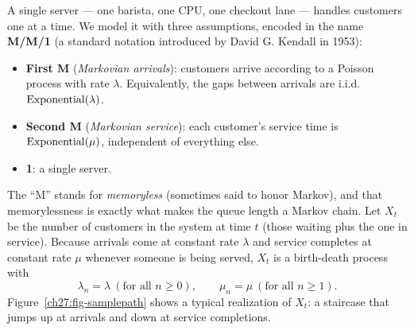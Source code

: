 A single server --- one barista, one CPU, one checkout lane --- handles
customers one at a time. We model it with three assumptions, encoded in the name
\textbf{M/M/1} (a standard notation introduced by David G. Kendall in 1953):

\begin{itemize}
  \item \textbf{First M} (\emph{Markovian arrivals}): customers arrive according to a Poisson process
  with rate $\lambda$. Equivalently, the gaps between arrivals are i.i.d.\ $\operatorname{Exponential}(\lambda)$.
  \item \textbf{Second M} (\emph{Markovian service}): each customer's service time is $\operatorname{Exponential}(\mu)$,
  independent of everything else.
  \item \textbf{1}: a single server.
\end{itemize}

The ``M'' stands for \emph{memoryless} (sometimes said to honor Markov), and that memorylessness is
exactly what makes the queue length a Markov chain. Let $X_t$ be the number of customers in the
system at time $t$ (those waiting plus the one in service). Because arrivals come at constant rate
$\lambda$ and service completes at constant rate $\mu$ whenever someone is being served, $X_t$ is a
birth-death process with
\[
  \lambda_n = \lambda \ (\text{for all } n \ge 0),
  \qquad \mu_n = \mu \ (\text{for all } n \ge 1).
\]
Figure~\ref{ch27:fig-samplepath} shows a typical realization of $X_t$: a staircase that jumps up at
arrivals and down at service completions.

